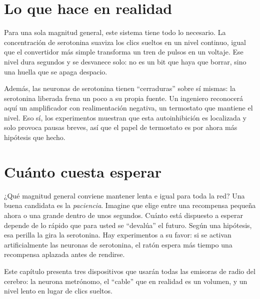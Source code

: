 
\section*{Lo que hace en realidad}

Para una sola magnitud general, este sistema tiene todo lo necesario. La concentración de serotonina suaviza los clics sueltos en un nivel continuo, igual que el convertidor más simple transforma un tren de pulsos en un voltaje. Ese nivel dura segundos y se desvanece solo: no es un bit que haya que borrar, sino una huella que se apaga despacio.

Además, las neuronas de serotonina tienen “cerraduras” sobre sí mismas: la serotonina liberada frena un poco a su propia fuente. Un ingeniero reconocerá aquí un amplificador con realimentación negativa, un termostato que mantiene el nivel. Eso sí, los experimentos muestran que esta autoinhibición es localizada y solo provoca pausas breves, así que el papel de termostato es por ahora más hipótesis que hecho.

\section*{Cuánto cuesta esperar}

¿Qué magnitud general conviene mantener lenta e igual para toda la red? Una buena candidata es la \emph{paciencia}. Imagine que elige entre una recompensa pequeña ahora o una grande dentro de unos segundos. Cuánto está dispuesto a esperar depende de lo rápido que para usted se “devalúa” el futuro. Según una hipótesis, esa perilla la gira la serotonina. Hay experimentos a su favor: si se activan artificialmente las neuronas de serotonina, el ratón espera más tiempo una recompensa aplazada antes de rendirse.

Este capítulo presenta tres dispositivos que usarán todas las emisoras de radio del cerebro: la neurona metrónomo, el “cable” que en realidad es un volumen, y un nivel lento en lugar de clics sueltos.

